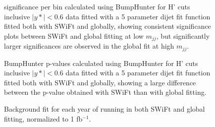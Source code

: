 \begin{figure}[!htb]
  \centering
  \caption{significance per bin calculated using BumpHunter for H' cuts inclusive $|y*|<0.6$ data fitted with a 5 parameter dijet fit function fitted both with SWiFt and globally, showing consistent significance plots between SWiFt and global fitting at low $m_{jj}$, but significantly larger significances are observed in the global fit at high $m_{jj}$.}
  \label{fig:ystar0.6FullRunBHFits}
\end{figure}



\begin{figure}[!htb]
  \centering
  \caption{BumpHunter p-values calculated using BumpHunter for H' cuts inclusive $|y*|<0.6$ data fitted with a 5 parameter dijet fit function fitted both with SWiFt and globally, showing a large difference between the p-value obtained with SWiFt than with global fitting.}
  \label{fig:ystar0.6FullRunBHPvalue}
\end{figure}

\begin{figure}[!htb]
  \centering
  \caption{Background fit for each year of running in both SWiFt and global fitting, normalized to 1 fb$^{-1}$.}
  \label{fig:ystar0.6IndividualFits}
\end{figure}
